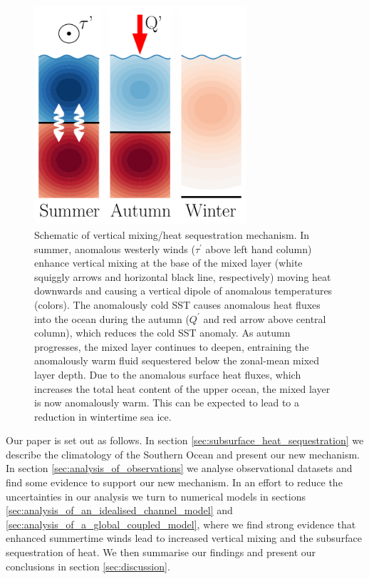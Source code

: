 \documentclass{ametsocV5}
\begin{document}
\begin{figure}[!ht]
    \begin{center}
        \includegraphics[width=0.7\textwidth]{figures/wind_mixing_schematic.pdf}
        \caption{Schematic of vertical mixing/heat sequestration mechanism. In summer, anomalous westerly winds ($\tau^{'}$ above left hand column) enhance vertical mixing at the base of the mixed layer (white squiggly arrows and horizontal black line, respectively) moving heat downwards and causing a vertical dipole of anomalous temperatures (colors). The anomalously cold SST causes anomalous heat fluxes into the ocean during the autumn ($Q^{'}$ and red arrow above central column), which reduces the cold SST anomaly. As autumn progresses, the mixed layer continues to deepen, entraining the anomalously warm fluid sequestered below the zonal-mean mixed layer depth. Due to the anomalous surface heat fluxes, which increases the total heat content of the upper ocean, the mixed layer is now anomalously warm. This can be expected to lead to a reduction in wintertime sea ice.}
        \label{fig:wind_mixing_schematic}
    \end{center}
\end{figure}


Our paper is set out as follows. In section \ref{sec:subsurface_heat_sequestration} we describe the climatology of the Southern Ocean and present our new mechanism. In section \ref{sec:analysis_of_observations} we analyse observational datasets and find some evidence to support our new mechanism. In an effort to reduce the uncertainties in our analysis we turn to numerical models in sections \ref{sec:analysis_of_an_idealised_channel_model} and \ref{sec:analysis_of_a_global_coupled_model}, where we find strong evidence that enhanced summertime winds lead to increased vertical mixing and the subsurface sequestration of heat. We then summarise our findings and present our conclusions in section \ref{sec:discussion}.
\end{document}
